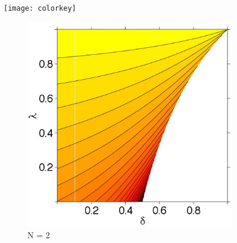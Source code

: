 \documentclass[11pt]{article}
\theoremstyle{definition}
\theoremstyle{definition}
\begin{document}
\begin{figure}
\centering
\hspace*{1.2em} 	\texttt{[image: colorkey]} %
\vspace{-1.65em}

        \centering
        \begin{subfigure}[b]{0.49\textwidth}
                \includegraphics[width=\textwidth]{ExtremeN2.jpeg}
\caption{N = 2}	
\label{ExtremeN2}
        \end{subfigure}%
        ~ %
        ~ %
        \begin{subfigure}[b]{0.49\textwidth}

\end{subfigure}
\end{figure}
\end{document}

